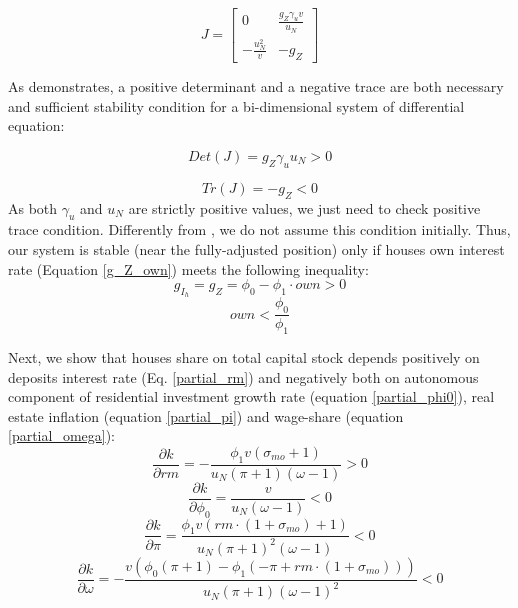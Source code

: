 \documentclass[11pt]{article}
\begin{document}
\begin{equation}
J = 
\label{Jacobiano}
\left[\begin{matrix}0 & \frac{g_Z \gamma_{u} v}{u_N}\\- \frac{u_N^{2}}{v} & - g_Z\end{matrix}\right]
\end{equation}

As \textcite{gandolfo_economic_2010} demonstrates, a positive determinant and a negative trace are both necessary and sufficient stability condition for a bi-dimensional system of differential equation:

$$
Det(J) = g_Z \gamma_{u} u_N > 0
$$

$$
Tr(J) = -g_Z < 0
$$
As both \(\gamma_u\) and \(u_N\) are strictly positive values, we just need to check positive trace condition.
Differently from \textcite{freitas_growth_2015}, we do not assume this condition initially.
Thus, our system is stable (near the fully-adjusted position) only if houses own interest rate (Equation \ref{g_Z_own}) meets the following inequality:
$$
g_{I_h} = g_Z = \phi_0 - \phi_1\cdot own > 0
$$
\begin{equation}
own < \frac{\phi_0}{\phi_1}
\end{equation}


Next, we show that houses share on total capital stock depends positively on deposits interest rate (Eq. \ref{partial_rm}) and negatively both on autonomous component of residential investment growth rate (equation \ref{partial_phi0}), real estate inflation (equation \ref{partial_pi}) and wage-share (equation \ref{partial_omega}):
\begin{equation}
\label{partial_rm}
\frac{\partial k}{\partial rm} = - \frac{\phi_{1} v \left(\sigma_{mo} + 1\right)}{u_N \left(\pi + 1\right) \left(\omega - 1\right)} > 0
\end{equation}
\begin{equation}
\label{partial_phi0}
\frac{\partial k}{\partial \phi_0} = \frac{v}{u_N \left(\omega - 1\right)} < 0
\end{equation}
\begin{equation}
\label{partial_pi}
\frac{\partial k}{\partial \pi} = \frac{\phi_{1} v \left(rm\cdot(1+\sigma_{mo}) + 1\right)}{u_N \left(\pi + 1\right)^{2} \left(\omega - 1\right)} < 0
\end{equation}
\begin{equation}
\label{partial_omega}
\frac{\partial k}{\partial \omega} = - \frac{v \left(\phi_{0} \left(\pi + 1\right) - \phi_{1} \left(- \pi + rm\cdot(1 + \sigma_{mo})\right)\right)}{u_N \left(\pi + 1\right) \left(\omega - 1\right)^{2}} < 0
\end{equation}
\end{document}
